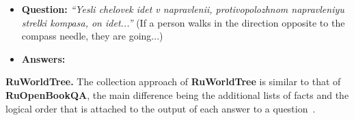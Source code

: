 \documentclass[11pt]{article}
\begin{document}
\begin{itemize}[noitemsep,leftmargin=1.em]
\item \textbf{Question:} \textit{``Yesli chelovek idet v napravlenii, protivopolozhnom napravleniyu strelki kompasa, on idet...''} (If a person walks in the direction opposite to the compass needle, they are going...)
\item \textbf{Answers:}
\end{itemize} 
\noindent\textbf{RuWorldTree.} The collection approach of \textbf{RuWorldTree} is similar to that of \textbf{RuOpenBookQA}, the main difference being the additional lists of facts and the logical order that is attached to the output of each answer to a question~\cite{jansen-etal-2018-worldtree}.
\end{document}
